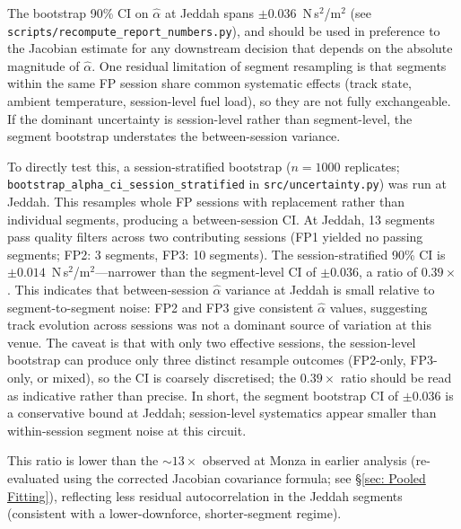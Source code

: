 The bootstrap 90\% CI on $\hat\alpha$ at Jeddah spans $\pm 0.036$~N\,s$^2$/m$^2$ (see \texttt{scripts/recompute\_report\_numbers.py}), and should be used in preference to the Jacobian estimate for any downstream decision that depends on the absolute magnitude of $\hat\alpha$. One residual limitation of segment resampling is that segments within the same FP session share common systematic effects (track state, ambient temperature, session-level fuel load), so they are not fully exchangeable. If the dominant uncertainty is session-level rather than segment-level, the segment bootstrap understates the between-session variance.

To directly test this, a session-stratified bootstrap ($n=1000$ replicates; \texttt{bootstrap\_alpha\_ci\_session\_stratified} in \texttt{src/uncertainty.py}) was run at Jeddah. This resamples whole FP sessions with replacement rather than individual segments, producing a between-session CI. At Jeddah, 13 segments pass quality filters across two contributing sessions (FP1 yielded no passing segments; FP2: 3 segments, FP3: 10 segments). The session-stratified 90\% CI is $\pm 0.014$~N\,s$^2$/m$^2$---narrower than the segment-level CI of $\pm 0.036$, a ratio of $0.39\times$. This indicates that between-session $\hat\alpha$ variance at Jeddah is small relative to segment-to-segment noise: FP2 and FP3 give consistent $\hat\alpha$ values, suggesting track evolution across sessions was not a dominant source of variation at this venue. The caveat is that with only two effective sessions, the session-level bootstrap can produce only three distinct resample outcomes (FP2-only, FP3-only, or mixed), so the CI is coarsely discretised; the $0.39\times$ ratio should be read as indicative rather than precise. In short, the segment bootstrap CI of $\pm 0.036$ is a conservative bound at Jeddah; session-level systematics appear smaller than within-session segment noise at this circuit. 

This ratio is lower than the $\sim\!13\times$ observed at Monza in earlier analysis (re-evaluated using the corrected Jacobian covariance formula; see \S\ref{sec: Pooled Fitting}), reflecting less residual autocorrelation in the Jeddah segments (consistent with a lower-downforce, shorter-segment regime). 


